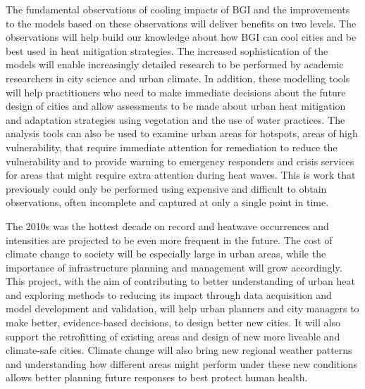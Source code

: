 The fundamental observations of cooling impacts of BGI and the improvements to the models based on these observations will deliver benefits on two levels. The observations will help build our knowledge about how BGI can cool cities and be best used in heat mitigation strategies. The increased sophistication of the models will enable increasingly detailed research to be performed by academic researchers in city science and urban climate. In addition, these modelling tools will help practitioners who need to make immediate decisions about the future design of cities and allow assessments to be made about urban heat mitigation and adaptation strategies using vegetation and the use of water practices. The analysis tools can also be used to examine urban areas for hotspots, areas of high vulnerability, that require immediate attention for remediation to reduce the vulnerability and to provide warning to emergency responders and crisis services for areas that might require extra attention during heat waves. This is work that previously could only be performed using expensive and difficult to obtain observations, often incomplete and captured at only a single point in time.

The 2010s was the hottest decade on record and heatwave occurrences and intensities are projected to be even more frequent in the future. The cost of climate change to society will be especially large in urban areas, while the importance of infrastructure planning and management will grow accordingly. This project, with the aim of contributing to better understanding of urban heat and exploring methods to reducing its impact through data acquisition and model development and validation, will help urban planners and city managers to make better, evidence-based decisions, to design better new cities. It will also support the retrofitting of existing areas and design of new more liveable and climate-safe cities. Climate change will also bring new regional weather patterns and understanding how different areas might perform under these new conditions allows better planning future responses to best protect human health.





